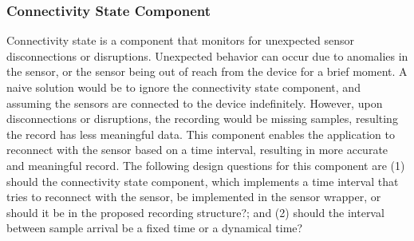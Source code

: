 \subsubsection{Connectivity State Component} \label{sssec:csc}
Connectivity state is a component that monitors for unexpected sensor disconnections or disruptions. Unexpected behavior can occur due to anomalies in the sensor, or the sensor being out of reach from the device for a brief moment.  A naive solution would be to ignore the connectivity state component, and assuming the sensors are connected to the device indefinitely. However, upon disconnections or disruptions, the recording would be missing samples, resulting the record has less meaningful data. This component enables the application to reconnect with the sensor based on a time interval, resulting in more accurate and meaningful record. The following design questions for this component are (1) should the connectivity state component, which implements a time interval that tries to reconnect with the sensor, be implemented in the sensor wrapper, or should it be in the proposed recording structure?; and (2) should the interval between sample arrival be a fixed time or a dynamical time? 


